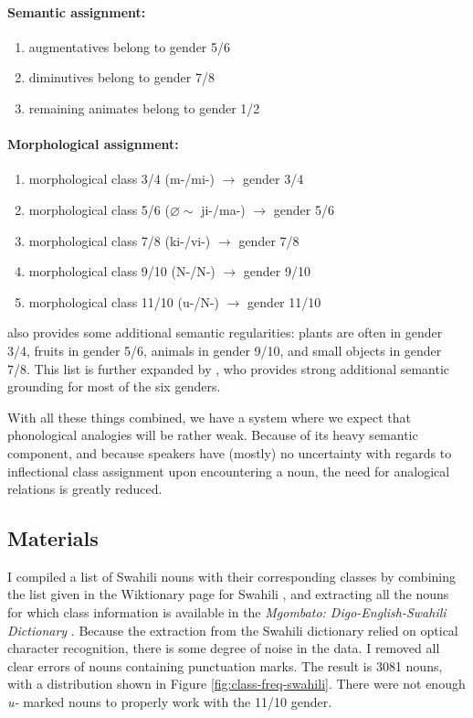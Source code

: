 \paragraph{Semantic assignment:}

\begin{enumerate}
  \item augmentatives belong to gender 5/6
  \item diminutives belong to gender 7/8
  \item remaining animates belong to gender 1/2
\end{enumerate}

\paragraph{Morphological assignment:}

\begin{enumerate}
  \item morphological class 3/4 (m-/mi-) $\rightarrow$ gender 3/4
  \item morphological class 5/6 ($\varnothing \sim$ ji-/ma-) $\rightarrow$ gender 5/6
  \item morphological class 7/8 (ki-/vi-) $\rightarrow$ gender 7/8
  \item morphological class 9/10 (N-/N-) $\rightarrow$ gender 9/10
  \item morphological class 11/10 (u-/N-) $\rightarrow$ gender 11/10
\end{enumerate}

\textcite[p. 48]{Corbett.1991} also provides some additional semantic regularities: plants are often in gender 3/4, fruits in gender 5/6, animals in gender 9/10, and small objects in gender 7/8. This list is further expanded by \textcite{Contini-Morava.1994}, who provides strong additional semantic grounding for most of the six genders.

With all these things combined, we have a system where we expect that phonological analogies will be rather weak. Because of its heavy semantic component, and because speakers have (mostly) no uncertainty with regards to inflectional class assignment upon encountering a noun, the need for analogical relations is greatly reduced.

\subsection{Materials}

I compiled a list of Swahili nouns with their corresponding classes by combining the list given in the Wiktionary page for Swahili \autocite{WikimediaFundation.2016}, and extracting all the nouns for which class information is available in the \textit{Mgombato: Digo-English-Swahili Dictionary} \autocite{Mwalonya.2004}. Because the extraction from the Swahili dictionary relied on optical character recognition, there is some degree of noise in the data. I removed all clear errors of nouns containing punctuation marks. The result is 3081 nouns, with a distribution shown in Figure \ref{fig:class-freq-swahili}. There were not enough \textit{u-} marked nouns to properly work with the 11/10 gender.

